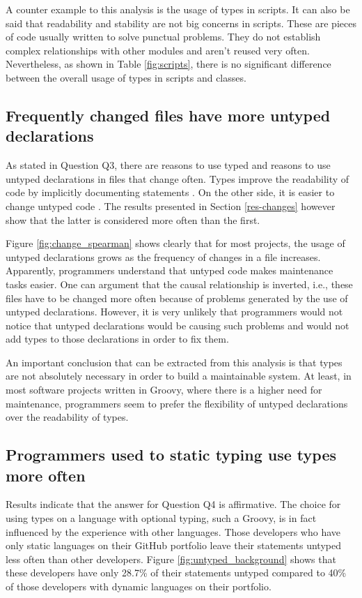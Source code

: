 \documentclass[preprint]{sigplanconf}
\begin{document}
A counter example to this analysis is the usage of types in scripts.
It can also be said that readability and stability are not big concerns in scripts.
These are pieces of code usually written to solve punctual problems.
They do not establish complex relationships with other modules and aren't reused very often.
Nevertheless, as shown in Table \ref{fig:scripts}, there is no significant difference between the overall usage of types in scripts and classes.

\subsection{Frequently changed files have more untyped declarations\label{discussion-q3}}
As stated in Question Q3, there are reasons to use typed and reasons to use untyped declarations in files that change often.
Types improve the readability of code by implicitly documenting statements \cite{should_your_specification_language_be_typed}.
On the other side, it is easier to change untyped code \cite{gradual_typing}.
The results presented in Section \ref{res-changes} however show that the latter is considered more often than the first.

Figure \ref{fig:change_spearman} shows clearly that for most projects, the usage of untyped declarations grows as the frequency of changes in a file increases.
Apparently, programmers understand that untyped code makes maintenance tasks easier.
One can argument that the causal relationship is inverted, i.e., these files have to be changed more often because of problems generated by the use of untyped declarations.
However, it is very unlikely that programmers would not notice that untyped declarations would be causing such problems and would not add types to those declarations in order to fix them.

An important conclusion that can be extracted from this analysis is that types are not absolutely necessary in order to build a maintainable system.
At least, in most software projects written in Groovy, where there is a higher need for maintenance, programmers seem to prefer the flexibility of untyped declarations over the readability of types.


\subsection{Programmers used to static typing use types more often\label{discussion-q4}}
Results indicate that the answer for Question Q4 is affirmative.
The choice for using types on a language with optional typing, such a Groovy, is in fact influenced by the experience  with other languages.
Those developers who have only static languages on their GitHub portfolio leave their statements untyped less often than other developers.
Figure \ref{fig:untyped_background} shows that these developers have only 28.7\% of their statements untyped compared to 40\% of those developers with dynamic languages on their portfolio. 
\end{document}
